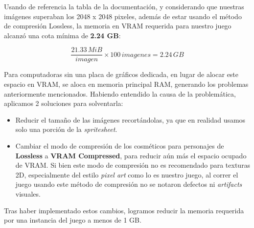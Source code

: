Usando de referencia la tabla de la documentación, y considerando que nuestras imágenes superaban
los 2048 x 2048 pixeles, además de estar usando el método de compresión Lossless,
la memoria en VRAM requerida para nuestro juego alcanzó una cota mínima de \textbf{2.24 GB}:

\[
\frac{21.33 \, MiB}{imagen} \times 100 \, imagenes = 2.24 \, GB
\]

Para computadoras sin una placa de gráficos dedicada, en lugar de alocar este espacio en VRAM,
se aloca en memoria principal RAM, generando los problemas anteriormente mencionados.
Habiendo entendido la causa de la problemática, aplicamos 2 soluciones para solventarla:

\begin{itemize}
    \item Reducir el tamaño de las imágenes recortándolas, ya que en realidad usamos solo
    una porción de la \textit{spritesheet}.
    \item Cambiar el modo de compresión de los cosméticos para personajes de \textbf{Lossless}
    a \textbf{VRAM Compressed}, para reducir aún más el espacio ocupado de VRAM. Si bien este
    modo de compresión no es recomendado para texturas 2D, especialmente del estilo
    \textit{pixel art} como lo es nuestro juego, al correr el juego usando este método de compresión
    no se notaron defectos ni \textit{artifacts} visuales.
\end{itemize}

Tras haber implementado estos cambios, logramos reducir la memoria requerida por una instancia
del juego a menos de 1 GB.
